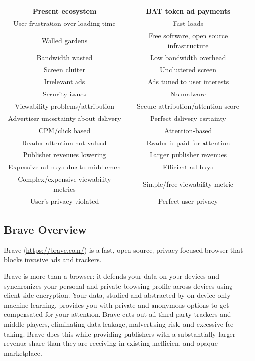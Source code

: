 \documentclass[11pt]{article}
\begin{document}
\begin{tabu}  to  \textwidth {|c|c|} \hline

{\textbf{Present ecosystem}} & {\textbf{BAT token ad payments}} \\  \hline

User frustration over loading time & Fast loads\\ %
Walled gardens & Free software, open source infrastructure\\ %
Bandwidth wasted & Low bandwidth overhead\\ %
Screen clutter & Uncluttered screen \\ %
Irrelevant ads & Ads tuned to user interests \\ %
Security issues & No malware \\ %
Viewability problems/attribution & Secure attribution/attention score\\ %
Advertiser uncertainty about delivery & Perfect delivery certainty \\ %
CPM/click based & Attention-based \\ %
Reader attention not valued & Reader is paid for attention \\ %
Publisher revenues lowering & Larger publisher revenues \\ %
Expensive ad buys due to middlemen & Efficient ad buys \\ %
Complex/expensive viewability metrics & Simple/free viewability metric \\ %
User’s privacy violated & Perfect user privacy \\ \hline
\end{tabu}


\subsection{Brave Overview}
\label{sec-5-3}

Brave (\href{https://brave.com/}{https://brave.com/}) is a fast, open source, privacy-focused browser that blocks invasive ads and trackers.

Brave is more than a browser: it defends your data on your devices and synchronizes your personal and private browsing profile across devices using client-side encryption. Your data, studied and abstracted by on-device-only machine learning, provides you with private and anonymous options to get compensated for your attention. Brave cuts out all third party trackers and middle-players, eliminating data leakage, malvertising risk, and excessive fee-taking. Brave does this while providing publishers with a substantially larger revenue share than they are receiving in existing inefficient and opaque marketplace. 
\end{document}
